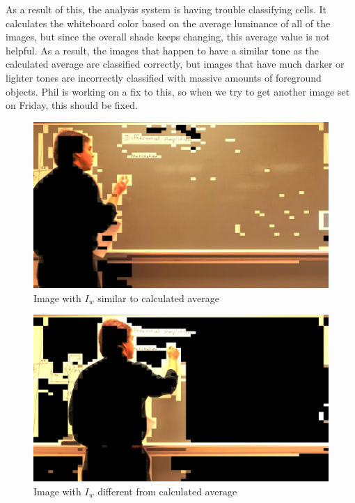 \documentclass[]{article}
\begin{document}
As a result of this, the analysis system is having trouble classifying cells.  It calculates the whiteboard color based on the average luminance of all of the images, but since the overall shade keeps changing, this average value is not helpful.  As a result, the images that happen to have a similar tone as the calculated average are classified correctly, but images that have much darker or lighter tones are incorrectly classified with massive amounts of foreground objects.  Phil is working on a fix to this, so when we try to get another image set on Friday, this should be fixed.

\begin{figure}[H]
\centering
\includegraphics[scale=0.2]{images/badIw_1}
\caption{Image with $I_w$ similar to calculated average}
\end{figure}	
		
\begin{figure}[H]
\centering
\includegraphics[scale=0.2]{images/badIw_2}
\caption{Image with $I_w$ different from calculated average}
\end{figure}
\end{document}
